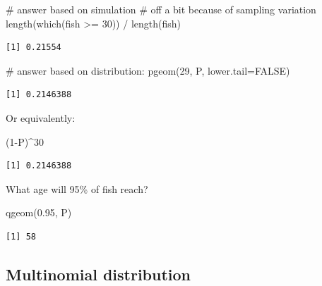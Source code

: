 \documentclass[
  13,
  letterpaper,
]{report}
\newenvironment{Shaded}{\begin{snugshade}}{\end{snugshade}}
\newcommand{\AttributeTok}[1]{\textcolor[rgb]{0.40,0.45,0.13}{#1}}
\newcommand{\CommentTok}[1]{\textcolor[rgb]{0.37,0.37,0.37}{#1}}
\newcommand{\ConstantTok}[1]{\textcolor[rgb]{0.56,0.35,0.01}{#1}}
\newcommand{\DecValTok}[1]{\textcolor[rgb]{0.68,0.00,0.00}{#1}}
\newcommand{\FloatTok}[1]{\textcolor[rgb]{0.68,0.00,0.00}{#1}}
\newcommand{\FunctionTok}[1]{\textcolor[rgb]{0.28,0.35,0.67}{#1}}
\newcommand{\NormalTok}[1]{\textcolor[rgb]{0.00,0.23,0.31}{#1}}
\newcommand{\SpecialCharTok}[1]{\textcolor[rgb]{0.37,0.37,0.37}{#1}}
\begin{document}
\begin{Shaded}
\begin{Highlighting}[]
\CommentTok{\# answer based on simulation}
\CommentTok{\# off a bit because of sampling variation}
\FunctionTok{length}\NormalTok{(}\FunctionTok{which}\NormalTok{(fish }\SpecialCharTok{\textgreater{}=} \DecValTok{30}\NormalTok{)) }\SpecialCharTok{/} \FunctionTok{length}\NormalTok{(fish)}
\end{Highlighting}
\end{Shaded}

\begin{verbatim}
[1] 0.21554
\end{verbatim}

\begin{Shaded}
\begin{Highlighting}[]
\CommentTok{\# answer based on distribution:}
\FunctionTok{pgeom}\NormalTok{(}\DecValTok{29}\NormalTok{, P, }\AttributeTok{lower.tail=}\ConstantTok{FALSE}\NormalTok{)}
\end{Highlighting}
\end{Shaded}

\begin{verbatim}
[1] 0.2146388
\end{verbatim}

Or equivalently:

\begin{Shaded}
\begin{Highlighting}[]
\NormalTok{(}\DecValTok{1}\SpecialCharTok{{-}}\NormalTok{P)}\SpecialCharTok{\^{}}\DecValTok{30}
\end{Highlighting}
\end{Shaded}

\begin{verbatim}
[1] 0.2146388
\end{verbatim}

What age will 95\% of fish reach?

\begin{Shaded}
\begin{Highlighting}[]
\FunctionTok{qgeom}\NormalTok{(}\FloatTok{0.95}\NormalTok{, P)}
\end{Highlighting}
\end{Shaded}

\begin{verbatim}
[1] 58
\end{verbatim}

\subsection{Multinomial distribution}\label{sec-dist-multinom}
\end{document}
